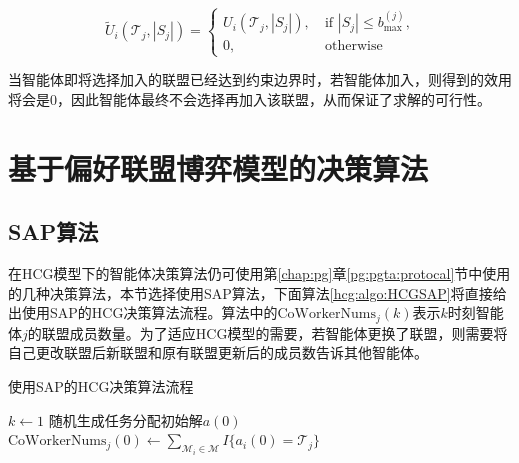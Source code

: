 \begin{equation}
\label{hcg:eq:modifiedAgentU}
	\widetilde U_i(\mathcal{T}_j,|S_j|) = 
	\begin{cases}
		U_i(\mathcal{T}_j,|S_j|),\ & \text{if $|S_j|\leq b_{\text{max}}^{(j)}$,}\\
		0,\ & \text{otherwise}
	\end{cases}
\end{equation}

当智能体即将选择加入的联盟已经达到约束边界时，若智能体加入，则得到的效用将会是0，因此智能体最终不会选择再加入该联盟，从而保证了求解的可行性。

\section{基于偏好联盟博弈模型的决策算法}
\label{hcg:decision}

\subsection{SAP算法}
在HCG模型下的智能体决策算法仍可使用第\ref{chap:pg}章\ref{pg:pgta:protocal}节中使用的几种决策算法，本节选择使用SAP算法，下面算法\ref{hcg:algo:HCGSAP}将直接给出使用SAP的HCG决策算法流程。算法中的$\text{CoWorkerNums}_j(k)$表示$k$时刻智能体$j$的联盟成员数量。为了适应HCG模型的需要，若智能体更换了联盟，则需要将自己更改联盟后新联盟和原有联盟更新后的成员数告诉其他智能体。

\begin{algorithm}[htb]
	\caption{使用SAP的HCG决策算法流程}
	\label{hcg:algo:HCGSAP}
	\small
	\SetAlgoLined
	$k \gets 1$\;
	随机生成任务分配初始解$a(0)$\;
	$\text{CoWorkerNums}_j(0) \gets \sum_{\mathcal{M}_i \in \mathcal{M}} I\{a_i(0)=\mathcal{T}_j\}$\;
\end{algorithm}

